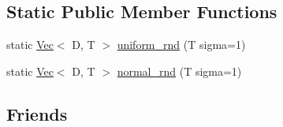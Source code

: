 \subsection*{Static Public Member Functions}
\begin{DoxyCompactItemize}
\item 
static \hyperlink{classtrimesh_1_1Vec}{Vec}$<$ D, T $>$ \hyperlink{classtrimesh_1_1Vec_a3fe9704a243014c011b439aa9009f6cf}{uniform\+\_\+rnd} (T sigma=1)
\item 
static \hyperlink{classtrimesh_1_1Vec}{Vec}$<$ D, T $>$ \hyperlink{classtrimesh_1_1Vec_afaa4d37120f8c61294c4b674891f3f9e}{normal\+\_\+rnd} (T sigma=1)
\end{DoxyCompactItemize}
\subsection*{Friends}
